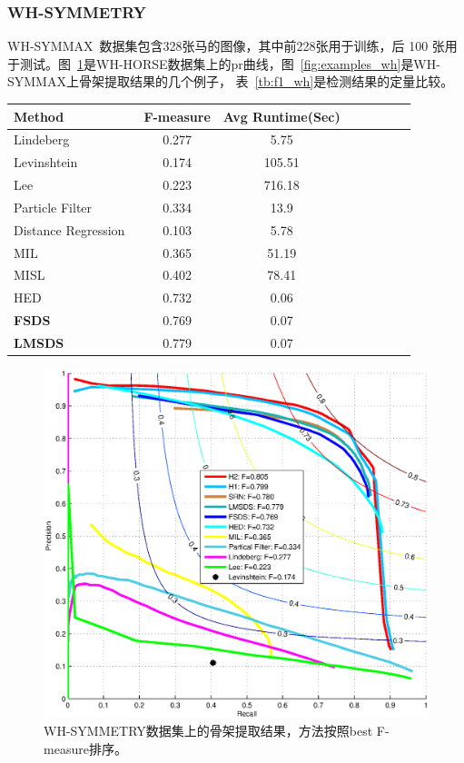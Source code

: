 \documentclass[UTF8]{ctexart}
\numberwithin{equation}{section} %
\numberwithin{table}{section} %
\begin{document}
\subsubsection{WH-SYMMETRY}
WH-SYMMAX~\cite{shen2016multiple}数据集包含328张马的图像，其中前228张用于训练，后 100 张用于测试。图~\ref{fig:pr_wh}是WH-HORSE数据集上的pr曲线，图~\ref{fig:examples_wh}是WH-SYMMAX上骨架提取结果的几个例子，
表~\ref{tb:f1_wh}是检测结果的定量比较。
\begin{center}
\begin{tabular}{l*{6}{c}r}
Method            & F-measure & Avg Runtime(Sec) \\
\hline
Lindeberg~\cite{lindeberg1998edge} & 0.277 & 5.75  \\
Levinshtein~\cite{levinshtein2013multiscale} & 0.174 & 105.51  \\
Lee~\cite{sie2013detecting} & 0.223 & 716.18  \\
Particle Filter~\cite{widynski2014local} & 0.334 & 13.9  \\
Distance Regression~\cite{sironi2014multiscale} & 0.103 & 5.78  \\
MIL~\cite{tsogkas2012learning} & 0.365 & 51.19  \\
MISL~\cite{shen2016multiple} & 0.402 & 78.41  \\
HED~\cite{xie2015holistically} & 0.732 & 0.06 \\
\textbf{FSDS}     & 0.769 &0.07 \\
\textbf{LMSDS}     & 0.779 &0.07 \\
\hline
\end{tabular}
\label{tb:f1_wh}
\end{center}
\begin{figure}[H]
\centering
\includegraphics[scale=0.5]{figures/pr-wh}
\caption{WH-SYMMETRY数据集上的骨架提取结果，方法按照best F-measure排序。}
\label{fig:pr_wh}
\end{figure}
\end{document}
